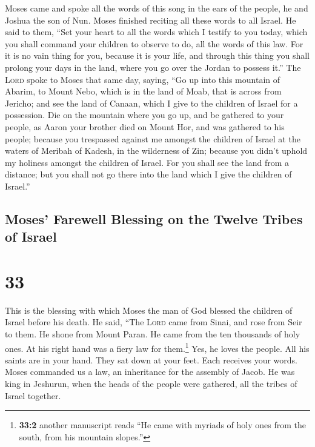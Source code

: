  Moses came and spoke all the words of this song in the
ears of the people, he and Joshua the son of Nun.  Moses
finished reciting all these words to all Israel.  He said
to them, ``Set your heart to all the words which I testify to you today,
which you shall command your children to observe to do, all the words of
this law.  For it is no vain thing for you, because it is
your life, and through this thing you shall prolong your days in the
land, where you go over the Jordan to possess it.''  The
\textsc{Lord} spoke to Moses that same day, saying,  ``Go
up into this mountain of Abarim, to Mount Nebo, which is in the land of
Moab, that is across from Jericho; and see the land of Canaan, which I
give to the children of Israel for a possession.  Die on
the mountain where you go up, and be gathered to your people, as Aaron
your brother died on Mount Hor, and was gathered to his people;
 because you trespassed against me amongst the children
of Israel at the waters of Meribah of Kadesh, in the wilderness of Zin;
because you didn't uphold my holiness amongst the children of Israel.
 For you shall see the land from a distance; but you
shall not go there into the land which I give the children of Israel.''

\hypertarget{moses-farewell-blessing-on-the-twelve-tribes-of-israel}{%
\subsection{Moses' Farewell Blessing on the Twelve Tribes of
Israel}\label{moses-farewell-blessing-on-the-twelve-tribes-of-israel}}

\hypertarget{section-32}{%
\section{33}\label{section-32}}

 This is the blessing with which Moses the man of God
blessed the children of Israel before his death.  He said,
``The \textsc{Lord} came from Sinai, and rose from Seir to them. He
shone from Mount Paran. He came from the ten thousands of holy ones. At
his right hand was a fiery law for them.\footnote{\textbf{33:2} another
  manuscript reads ``He came with myriads of holy ones from the south,
  from his mountain slopes.''}  Yes, he loves the people.
All his saints are in your hand. They sat down at your feet. Each
receives your words.  Moses commanded us a law, an
inheritance for the assembly of Jacob.  He was king in
Jeshurun, when the heads of the people were gathered, all the tribes of
Israel together.


